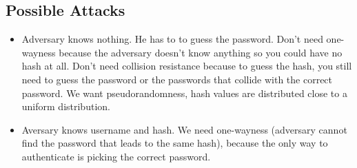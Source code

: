 \documentclass[psamsfonts]{amsart}
\begin{document}
\subsection{Possible Attacks}
\begin{itemize}
  \item Adversary knows nothing. He has to to guess the password. Don't need one-wayness because the adversary doesn't know anything so you could have no hash at all. Don't need collision resistance because to guess the hash, you still need to guess the password or the passwords that collide with the correct password. We want pseudorandomness, hash values are distributed close to a uniform distribution.
  \item Aversary knows username and hash. We need one-wayness (adversary cannot find the password that leads to the same hash), because the only way to authenticate is picking the correct password.
\end{itemize}
\end{document}
